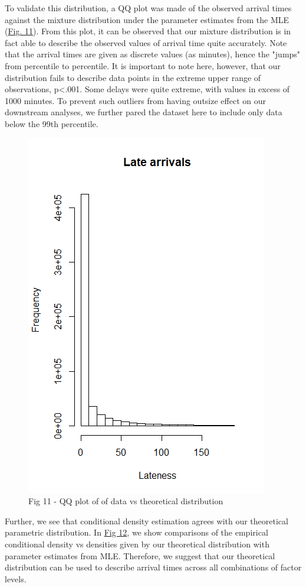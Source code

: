 \documentclass[12pt, a4paper]{book}
\newcommand\tab[1][1cm]{\hspace*{#1}}
\begin{document}
	\tab To validate this distribution, a QQ plot was made of the observed arrival times against the mixture distribution under the parameter estimates from the MLE (\underline{Fig. 11}). From this plot, it can be observed that our mixture distribution is in fact able to describe the observed values of arrival time quite accurately. Note that the arrival times are given as discrete values (as minutes), hence the "jumps" from percentile to percentile. It is important to note here, however, that our distribution fails to describe data points in the extreme upper range of observations, p<.001. Some delays were quite extreme, with values in excess of 1000 minutes. To prevent such outliers from having outsize effect on our downstream analyses, we further pared the dataset here to include only data below the 99th percentile.  \\
			\begin{figure}
			\centering
	 		\includegraphics[width = .45 \textwidth]{../figures/LateArrivalsHistogram}
	 		\caption{Fig 11  - QQ plot of of data vs theoretical distribution}
	 		\end{figure}
	\tab Further, we see that conditional density estimation agrees with our theoretical parametric distribution. In \underline{Fig 12}, we show comparisons of the empirical conditional density vs densities given by our theoretical distribution with parameter estimates from MLE. Therefore, we suggest that our theoretical distribution can be used to describe arrival times across all combinations of factor levels. \\
\end{document}
